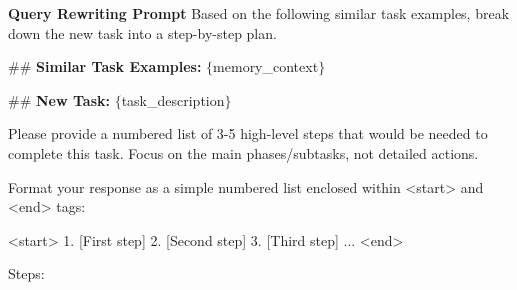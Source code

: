 \begin{Prompt}{\textbf{Query Rewriting Prompt}}{}
Based on the following similar task examples, break down the new task into a step-by-step plan.

\#\# \textbf{Similar Task Examples:}
$\{$memory\_context$\}$

\#\# \textbf{New Task: }
$\{$task\_description$\}$

Please provide a numbered list of 3-5 high-level steps that would be needed to complete this task.
Focus on the main phases/subtasks, not detailed actions.

Format your response as a simple numbered list enclosed within <start> and <end> tags:

<start>
1. [First step]
2. [Second step]
3. [Third step]
...
<end>

Steps:
\end{Prompt}
